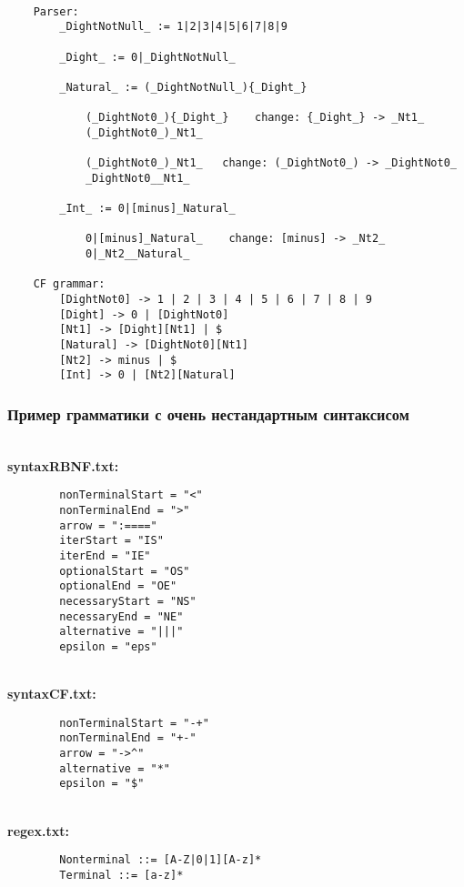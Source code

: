 \documentclass[12pt]{article}
\begin{document}
    \hfill \\
    \begin{lstlisting}
    Parser:
        _DightNotNull_ := 1|2|3|4|5|6|7|8|9

        _Dight_ := 0|_DightNotNull_

        _Natural_ := (_DightNotNull_){_Dight_}

            (_DightNot0_){_Dight_}    change: {_Dight_} -> _Nt1_
            (_DightNot0_)_Nt1_

            (_DightNot0_)_Nt1_   change: (_DightNot0_) -> _DightNot0_
            _DightNot0__Nt1_

        _Int_ := 0|[minus]_Natural_

            0|[minus]_Natural_    change: [minus] -> _Nt2_
            0|_Nt2__Natural_

    CF grammar:
        [DightNot0] -> 1 | 2 | 3 | 4 | 5 | 6 | 7 | 8 | 9
        [Dight] -> 0 | [DightNot0]
        [Nt1] -> [Dight][Nt1] | $
        [Natural] -> [DightNot0][Nt1]
        [Nt2] -> minus | $
        [Int] -> 0 | [Nt2][Natural]
    \end{lstlisting}

    \clearpage


    \subsubsection*{\large Пример грамматики с очень нестандартным синтаксисом}

    \hfill \\
    {\bfseries syntaxRBNF.txt:}
    \begin{lstlisting}
        nonTerminalStart = "<"
        nonTerminalEnd = ">"
        arrow = ":===="
        iterStart = "IS"
        iterEnd = "IE"
        optionalStart = "OS"
        optionalEnd = "OE"
        necessaryStart = "NS"
        necessaryEnd = "NE"
        alternative = "|||"
        epsilon = "eps"
    \end{lstlisting}

    \hfill \\
    {\bfseries syntaxCF.txt:}
    \begin{lstlisting}
        nonTerminalStart = "-+"
        nonTerminalEnd = "+-"
        arrow = "->^"
        alternative = "*"
        epsilon = "$"
    \end{lstlisting}

    \hfill \\
    {\bfseries regex.txt:}
    \begin{lstlisting}
        Nonterminal ::= [A-Z|0|1][A-z]*
        Terminal ::= [a-z]*
    \end{lstlisting}
\end{document}
